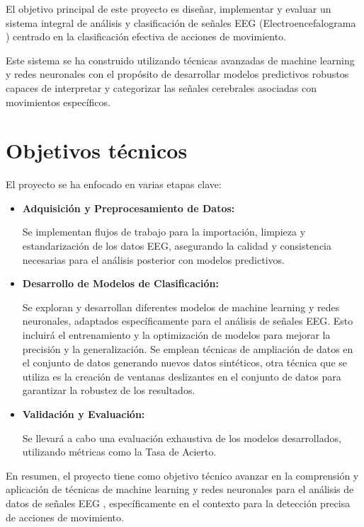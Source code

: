 
El objetivo principal de este proyecto es diseñar, implementar y evaluar un sistema integral de análisis y clasificación de señales EEG (Electroencefalograma ) centrado en la clasificación efectiva de acciones de movimiento. 

Este sistema se ha construido utilizando técnicas avanzadas de machine learning y redes neuronales con el propósito de desarrollar modelos predictivos robustos capaces de interpretar y categorizar las señales cerebrales asociadas con movimientos específicos.


\section{Objetivos  técnicos}


El proyecto se ha enfocado en varias etapas clave:

\begin{itemize}
\item
\textbf{Adquisición y Preprocesamiento de Datos:}

 Se implementan flujos de trabajo para la importación, limpieza y estandarización de los datos EEG, asegurando la calidad y consistencia necesarias para el análisis posterior con modelos predictivos.

\item
\textbf{Desarrollo de Modelos de Clasificación:}

 Se exploran y desarrollan diferentes modelos de machine learning y redes neuronales, adaptados específicamente para el análisis de señales EEG. Esto incluirá el entrenamiento y la optimización de modelos para mejorar la precisión y la generalización. Se emplean técnicas de ampliación de datos en el conjunto de datos generando nuevos datos sintéticos, otra técnica que se utiliza es la creación de ventanas deslizantes en el conjunto de datos para garantizar la robustez de los resultados.

\item
\textbf{Validación y Evaluación:} 

Se llevará a cabo una evaluación exhaustiva de los modelos desarrollados, utilizando métricas como la Tasa de Acierto.

\end{itemize}

En resumen, el proyecto tiene como objetivo técnico avanzar en la comprensión y aplicación de técnicas de machine learning y redes neuronales para el análisis de datos de señales EEG , específicamente en el contexto  para la detección precisa de acciones de movimiento.

